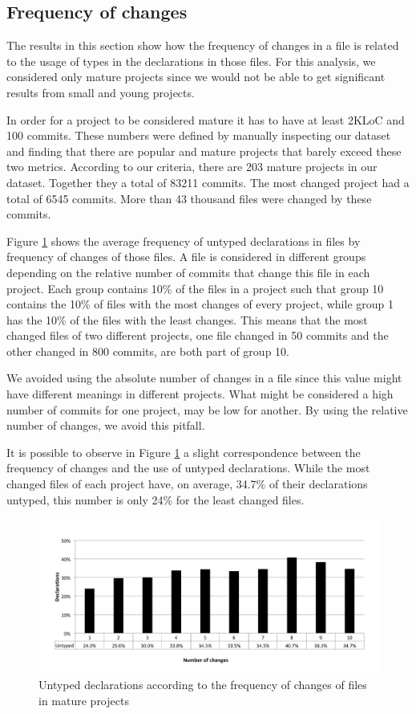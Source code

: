 \documentclass[preprint]{sigplanconf}
\begin{document}
\subsection{Frequency of changes\label{res-changes}}
The results in this section show how the frequency of changes in a file is related to the usage of types in the declarations in those files.
For this analysis, we considered only mature projects since we would not be able to get significant results from small and young projects.

In order for a project to be considered mature it has to have at least 2KLoC and 100 commits.
These numbers were defined by manually inspecting our dataset and finding that there are popular and mature projects that barely exceed these two metrics.
According to our criteria, there are 203 mature projects in our dataset.
Together they a total of 83211 commits. 
The most changed project had a total of 6545 commits.
More than 43 thousand files were changed by these commits.

Figure \ref{fig:change_mean} shows the average frequency of untyped declarations in files by frequency of changes of those files.
A file is considered in different groups depending on the relative number of commits that change this file in each project.
Each group contains 10\% of the files in a project such that group 10 contains the 10\% of files with the most changes of every project, while group 1 has the 10\% of the files with the least changes.
This means that the most changed files of two different projects, one file changed in 50 commits and the other changed in 800 commits, are both part of group 10.

We avoided using the absolute number of changes in a file since this value might have different meanings in different projects.
What might be considered a high number of commits for one project, may be low for another.
By using the relative number of changes, we avoid this pitfall.

It is possible to observe in Figure \ref{fig:change_mean} a slight correspondence between the frequency of changes and the use of untyped declarations.
While the most changed files of each project have, on average, 34.7\% of their declarations untyped, this number is only 24\% for the least changed files.

\begin{figure}[ht]
\centering 
\includegraphics[width=1\textwidth]{change_mean} 
\caption{Untyped declarations according to the frequency of changes of files in mature projects}
\label{fig:change_mean} 
\end{figure}
\end{document}
